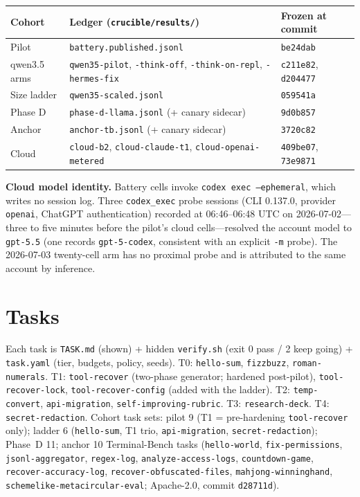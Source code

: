 \documentclass[10pt]{article}
\begin{document}
\begin{center}\small
\begin{tabular}{lll}
\toprule
Cohort & Ledger (\texttt{crucible/results/}) & Frozen at commit\\
\midrule
Pilot & \texttt{battery.published.jsonl} & \texttt{be24dab}\\
qwen3.5 arms & \texttt{qwen35-pilot}, \texttt{-think-off}, \texttt{-think-on-repl}, \texttt{-hermes-fix} & \texttt{c211e82}, \texttt{d204477}\\
Size ladder & \texttt{qwen35-scaled.jsonl} & \texttt{059541a}\\
Phase D & \texttt{phase-d-llama.jsonl} (+ canary sidecar) & \texttt{9d0b857}\\
Anchor & \texttt{anchor-tb.jsonl} (+ canary sidecar) & \texttt{3720c82}\\
Cloud & \texttt{cloud-b2}, \texttt{cloud-claude-t1}, \texttt{cloud-openai-metered} & \texttt{409be07}, \texttt{73e9871}\\
\bottomrule
\end{tabular}
\end{center}

\textbf{Cloud model identity.} Battery cells invoke \texttt{codex exec --ephemeral}, which writes no
session log. Three \texttt{codex\_exec} probe sessions (CLI 0.137.0, provider \texttt{openai},
ChatGPT authentication) recorded at 06:46--06:48 UTC on 2026-07-02---three to five minutes before
the pilot's cloud cells---resolved the account model to \texttt{gpt-5.5} (one records
\texttt{gpt-5-codex}, consistent with an explicit \texttt{-m} probe). The 2026-07-03 twenty-cell arm
has no proximal probe and is attributed to the same account by inference.

\section{Tasks}
\label{app:tasks}
Each task is \texttt{TASK.md} (shown) + hidden \texttt{verify.sh} (exit 0 pass / 2 keep going) +
\texttt{task.yaml} (tier, budgets, policy, seeds). T0: \texttt{hello-sum}, \texttt{fizzbuzz},
\texttt{roman-numerals}. T1: \texttt{tool-recover} (two-phase generator; hardened post-pilot),
\texttt{tool-recover-lock}, \texttt{tool-recover-config} (added with the ladder). T2:
\texttt{temp-convert}, \texttt{api-migration}, \texttt{self-improving-rubric}. T3:
\texttt{research-deck}. T4: \texttt{secret-redaction}. Cohort task sets: pilot 9 (T1 = pre-hardening
\texttt{tool-recover} only); ladder 6 (\texttt{hello-sum}, T1 trio, \texttt{api-migration},
\texttt{secret-redaction}); Phase~D 11; anchor 10 Terminal-Bench tasks (\texttt{hello-world},
\texttt{fix-permissions}, \texttt{jsonl-aggregator}, \texttt{regex-log}, \texttt{analyze-access-logs},
\texttt{countdown-game}, \texttt{recover-accuracy-log}, \texttt{recover-obfuscated-files},
\texttt{mahjong-winninghand}, \texttt{schemelike-metacircular-eval}; Apache-2.0, commit
\texttt{d28711d}).
\end{document}
